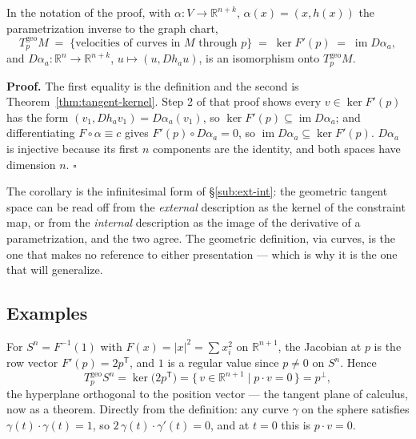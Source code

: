 \documentclass[11pt]{report}
\makeatletter
\newcounter{thmcounter}[section]
\newcounter{excounter}[section]
\renewenvironment{proof}[1][Proof]{\noindent\textbf{#1.} }{\hfill$\square$\par\vspace{5pt}}
\newcommand{\thmlabel}[1]{\edef\@currentlabel{\arabic{section}.\arabic{thmcounter}}\label{#1}}
\newcommand{\exlabel}[1]{\edef\@currentlabel{\arabic{section}.\arabic{excounter}}\label{#1}}
\newcommand{\geo}{\mathrm{geo}}
\newcommand{\leeref}[1]{\par\smallskip{\raggedleft\footnotesize\textsc{Lee}:\ #1\par}}
\makeatother
\begin{document}
\begin{corbox}\thmlabel{cor:tangent-three}
In the notation of the proof, with $\alpha : V \to \mathbb{R}^{n+k}$, $\alpha(x) = (x, h(x))$ the parametrization inverse to the graph chart,
\[
T^{\geo}_pM \;=\; \{\text{velocities of curves in } M \text{ through } p\} \;=\; \ker F'(p) \;=\; \operatorname{im} D\alpha_a ,
\]
and $D\alpha_a : \mathbb{R}^n \to \mathbb{R}^{n+k}$, $u \mapsto (u, Dh_a u)$, is an isomorphism onto $T^{\geo}_pM$.
\leeref{Propositions 5.37 and 5.38}
\end{corbox}

\begin{proof}
The first equality is the definition and the second is Theorem~\ref{thm:tangent-kernel}. Step 2 of that proof shows every $v \in \ker F'(p)$ has the form $(v_1, Dh_a v_1) = D\alpha_a(v_1)$, so $\ker F'(p) \subseteq \operatorname{im} D\alpha_a$; and differentiating $F \circ \alpha \equiv c$ gives $F'(p) \circ D\alpha_a = 0$, so $\operatorname{im} D\alpha_a \subseteq \ker F'(p)$. $D\alpha_a$ is injective because its first $n$ components are the identity, and both spaces have dimension $n$.
\end{proof}

\begin{rembox}\label{rem:tangent-4}
The corollary is the infinitesimal form of \S\ref{sub:ext-int}: the geometric tangent space can be read off from the \emph{external} description as the kernel of the constraint map, or from the \emph{internal} description as the image of the derivative of a parametrization, and the two agree. The geometric definition, via curves, is the one that makes no reference to either presentation --- which is why it is the one that will generalize.
\end{rembox}

\subsection{Examples}

\begin{exbox}\exlabel{ex:tangent-sphere}
For $S^n = F^{-1}(1)$ with $F(x) = |x|^2 = \sum x_i^2$ on $\mathbb{R}^{n+1}$, the Jacobian at $p$ is the row vector $F'(p) = 2p^{\mathsf T}$, and $1$ is a regular value since $p \neq 0$ on $S^n$. Hence
\[
T^{\geo}_pS^n = \ker\big(2p^{\mathsf T}\big) = \{\, v \in \mathbb{R}^{n+1} \mid p \cdot v = 0 \,\} = p^{\perp},
\]
the hyperplane orthogonal to the position vector --- the tangent plane of calculus, now as a theorem. Directly from the definition: any curve $\gamma$ on the sphere satisfies $\gamma(t)\cdot\gamma(t) = 1$, so $2\,\gamma(t)\cdot\gamma'(t) = 0$, and at $t = 0$ this is $p \cdot v = 0$.
\end{exbox}
\end{document}
